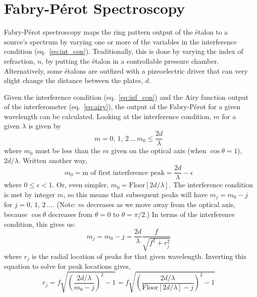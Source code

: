 \documentclass{article}
\begin{document}

\section{Fabry-P\'{e}rot Spectroscopy}
Fabry-P\'{e}rot spectroscopy maps the ring pattern output of the \'{e}talon to a source's spectrum by varying one or more of the variables in the interference condition (eq.~\ref{eq:int_con}). Traditionally, this is done by varying the index of refraction, $n$, by putting the \'{e}talon in a controllable pressure chamber. Alternatively, some \'{e}talons are outfized with a pizeoelectric driver that can very slight change the distance between the plates, $d$. 






Given the interference condition (eq.~\ref{eq:inf_con}) and the Airy function output of the interferometer (eq.~\ref{eq:airy}), the output of the Fabry-P\'{e}rot for a given wavelength can be calculated. Looking at the interference condition, $m$ for a given $\lambda$ is given by 
\begin{equation}
m = 0,\,1,\,2\,...\,m_{0}\leq\frac{2d}{\lambda}
\end{equation}
where $m_{0}$ must be less than the $m$ given on the optical axis (when $\cos{\theta}=1$), $2d/\lambda$. Written another way,
\begin{equation}
m_{0} = \text{m of first interference peak} = \frac{2d}{\lambda} - \epsilon
\end{equation}
where $0\leq\epsilon<1$. Or, even simpler, $m_{0}=\text{Floor}[2d/\lambda]$. The interference condition is met by integer $m$, so this means that subsequent peaks will have $m_{j}=m_{0}-j$ for $j=0,\,1,\,2\,...$. (Note: $m$ decreases as we move away from the optical axis, because $\cos{\theta}$ decreases from $\theta=0$ to $\theta=\pi/2$.) In terms of the interference condition, this gives us:
\begin{equation}
m_{j}=m_{0}-j =\frac{2d}{\lambda}\frac{f}{\sqrt{f^{2}+r_{j}^{2}}}
\label{eq:mj}
\end{equation}
where $r_{j}$ is the radial location of peaks for that given wavelength. Inverting this equation to solve for peak locations gives,
\begin{equation}
r_{j} = f\sqrt{\left(\frac{2d/\lambda}{m_{0}-j}\right)^{2}-1}=f\sqrt{\left(\frac{2d/\lambda}{\text{Floor}[2d/\lambda]-j}\right)^{2}-1}
\end{equation}
\end{document}
